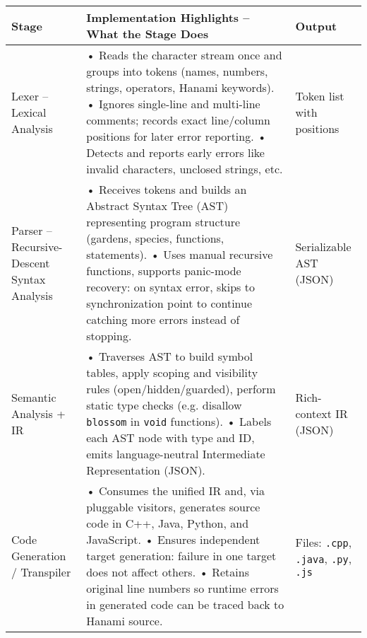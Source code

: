 \documentclass[a4paper,12pt]{article}
\begin{document}
\begin{longtable}{|>{\raggedright\arraybackslash}p{3.5cm}|>{\raggedright\arraybackslash}p{6.8cm}|>{\raggedright\arraybackslash}p{4.5cm}|}
\hline
\textbf{Stage} & \textbf{Implementation Highlights – What the Stage Does} & \textbf{Output} \\
\hline
Lexer – Lexical Analysis & 
• Reads the character stream once and groups into tokens (names, numbers, strings, operators, Hanami keywords). \newline
• Ignores single-line and multi-line comments; records exact line/column positions for later error reporting. \newline
• Detects and reports early errors like invalid characters, unclosed strings, etc. &
Token list with positions \\
\hline
Parser – Recursive-Descent Syntax Analysis &
• Receives tokens and builds an Abstract Syntax Tree (AST) representing program structure (gardens, species, functions, statements). \newline
• Uses manual recursive functions, supports panic-mode recovery: on syntax error, skips to synchronization point to continue catching more errors instead of stopping. &
Serializable AST (JSON) \\
\hline
Semantic Analysis + IR &
• Traverses AST to build symbol tables, apply scoping and visibility rules (open/hidden/guarded), perform static type checks (e.g. disallow \texttt{blossom} in \texttt{void} functions). \newline
• Labels each AST node with type and ID, emits language-neutral Intermediate Representation (JSON). &
Rich-context IR (JSON) \\
\hline
Code Generation / Transpiler &
• Consumes the unified IR and, via pluggable visitors, generates source code in C++, Java, Python, and JavaScript. \newline
• Ensures independent target generation: failure in one target does not affect others. \newline
• Retains original line numbers so runtime errors in generated code can be traced back to Hanami source. &
Files: \texttt{.cpp}, \texttt{.java}, \texttt{.py}, \texttt{.js} \\
\hline
\end{longtable}
\end{document}
